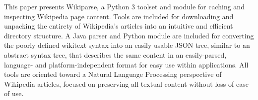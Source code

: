 This paper presents Wikiparse, a Python 3 toolset and module for caching and inspecting Wikipedia page content. Tools are included for downloading and unpacking the entirety of Wikipedia's articles into an intuitive and efficient directory structure. A Java parser and Python module are included for converting the poorly defined wikitext syntax into an easily usable JSON tree, similar to an abstract syntax tree, that describes the same content in an easily-parsed, language- and platform-independent format for easy use within applications. All tools are oriented toward a Natural Language Processing perspective of Wikipedia articles, focused on preserving all textual content without loss of ease of use.